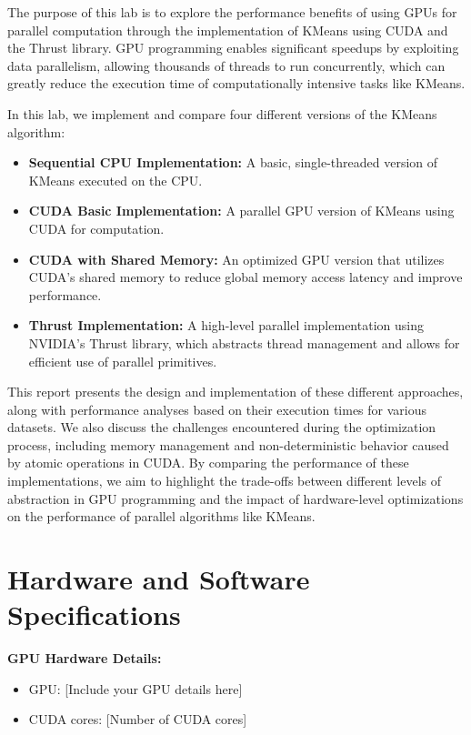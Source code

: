 \documentclass[letterpaper,12pt]{article}
\theoremstyle{remark}
\begin{document}
The purpose of this lab is to explore the performance benefits of using GPUs for parallel computation through the implementation of KMeans using CUDA and the Thrust library. GPU programming enables significant speedups by exploiting data parallelism, allowing thousands of threads to run concurrently, which can greatly reduce the execution time of computationally intensive tasks like KMeans. 

In this lab, we implement and compare four different versions of the KMeans algorithm:
\begin{itemize}
    \item \textbf{Sequential CPU Implementation:} A basic, single-threaded version of KMeans executed on the CPU.
    \item \textbf{CUDA Basic Implementation:} A parallel GPU version of KMeans using CUDA for computation.
    \item \textbf{CUDA with Shared Memory:} An optimized GPU version that utilizes CUDA's shared memory to reduce global memory access latency and improve performance.
    \item \textbf{Thrust Implementation:} A high-level parallel implementation using NVIDIA's Thrust library, which abstracts thread management and allows for efficient use of parallel primitives.
\end{itemize}

This report presents the design and implementation of these different approaches, along with performance analyses based on their execution times for various datasets. We also discuss the challenges encountered during the optimization process, including memory management and non-deterministic behavior caused by atomic operations in CUDA. By comparing the performance of these implementations, we aim to highlight the trade-offs between different levels of abstraction in GPU programming and the impact of hardware-level optimizations on the performance of parallel algorithms like KMeans.



\section{Hardware and Software Specifications}
\textbf{GPU Hardware Details:}
\begin{itemize}
    \item GPU: [Include your GPU details here]
    \item CUDA cores: [Number of CUDA cores]
\end{itemize}
\end{document}
